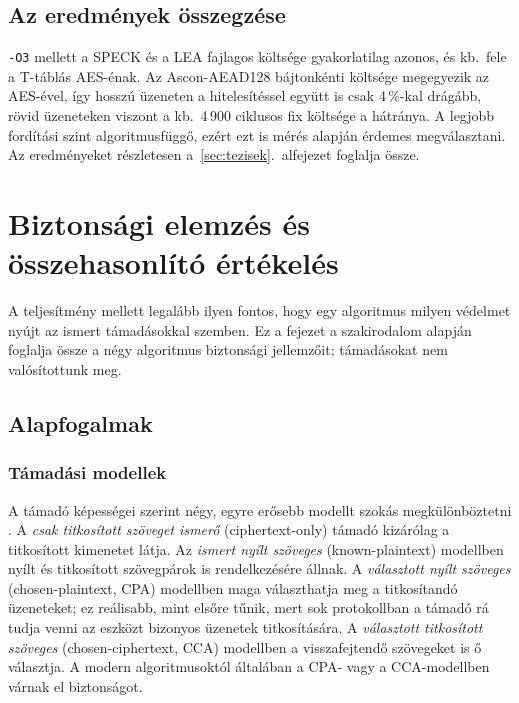 \documentclass[a4paper,12pt]{report}
\theoremstyle{definition}
\theoremstyle{remark}
\begin{document}
\section{Az eredmények összegzése}\label{sec:osszesites}

\texttt{-O3} mellett a SPECK és a LEA fajlagos költsége gyakorlatilag azonos, és kb.\ fele a T-táblás AES-énak. Az Ascon-AEAD128 bájtonkénti költsége megegyezik az AES-ével, így hosszú üzeneten a hitelesítéssel együtt is csak 4\,\%-kal drágább, rövid üzeneteken viszont a kb.\ 4\,900 ciklusos fix költsége a hátránya. A legjobb fordítási szint algoritmusfüggő, ezért ezt is mérés alapján érdemes megválasztani. Az eredményeket részletesen a~\ref{sec:tezisek}.~alfejezet foglalja össze.

\chapter{Biztonsági elemzés és összehasonlító értékelés}\label{chap:biztonsag}

A teljesítmény mellett legalább ilyen fontos, hogy egy algoritmus milyen védelmet nyújt az ismert támadásokkal szemben. Ez a fejezet a szakirodalom alapján foglalja össze a négy algoritmus biztonsági jellemzőit; támadásokat nem valósítottunk meg.

\section{Alapfogalmak}\label{sec:kriptoanalizis_alap}

\subsection{Támadási modellek}

A támadó képességei szerint négy, egyre erősebb modellt szokás megkülönböztetni \cite{Stallings2017}. A \emph{csak titkosított szöveget ismerő} (ciphertext-only) támadó kizárólag a titkosított kimenetet látja. Az \emph{ismert nyílt szöveges} (known-plaintext) modellben nyílt és titkosított szövegpárok is rendelkezésére állnak. A \emph{választott nyílt szöveges} (chosen-plaintext, CPA) modellben maga választhatja meg a titkosítandó üzeneteket; ez reálisabb, mint elsőre tűnik, mert sok protokollban a támadó rá tudja venni az eszközt bizonyos üzenetek titkosítására. A \emph{választott titkosított szöveges} (chosen-ciphertext, CCA) modellben a visszafejtendő szövegeket is ő választja. A modern algoritmusoktól általában a CPA- vagy a CCA-modellben várnak el biztonságot.
\end{document}
